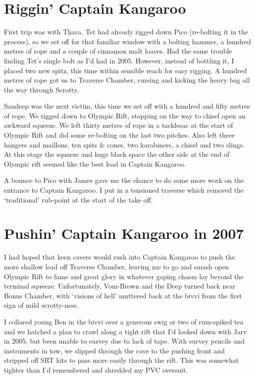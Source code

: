 
\hypertarget{riggin-captain-kangaroo}{%
\section{Riggin' Captain Kangaroo}\label{riggin-captain-kangaroo}}

First trip was with Thara. Tet had already rigged down Pico (re-bolting
it in the process), so we set off for that familiar window with a
bolting hammer, a hundred metres of rope and a couple of cinnamon malt
loaves. Had the same trouble finding Tet's single bolt as I'd had in
2005. However, instead of bottling it, I placed two new spitz, this time
within sensible reach for easy rigging. A hundred metres of rope got us
to Traverse Chamber, cursing and kicking the heavy bag all the way
through Scrotty.

Sandeep was the next victim, this time we set off with a hundred and
fifty metres of rope. We rigged down to Olympic Rift, stopping on the
way to chisel open an awkward squeeze. We left thirty metres of rope in
a tacklesac at the start of Olympic Rift and did some re-bolting on the
last two pitches. Also left three hangers and maillons, ten spits \&
cones, two karabiners, a chisel and two slings. At this stage the
squeeze and huge black space the other side at the end of Olympic rift
seemed like the best lead in Captain Kangaroo.

A bounce to Pico with James gave me the chance to do some more work on
the entrance to Captain Kangaroo. I put in a tensioned traverse which
removed the `traditional' rub-point at the start of the take off.


\hypertarget{pushin-captain-kangaroo-in-2007}{%
\section{Pushin' Captain Kangaroo in
2007}\label{pushin-captain-kangaroo-in-2007}}

I had hoped that keen cavers would rush into Captain Kangaroo to push
the more shallow lead off Traverse Chamber, leaving me to go and smash
open Olympic Rift to fame and great glory in whatever gaping chasm lay
beyond the terminal squeeze. Unfortunately, Vom-Brown and the Deep
turned back near Bonus Chamber, with `visions of hell' muttered back at
the bivvi from the first sign of mild scrotty-ness.

I collared young Ben in the bivvi over a generous swig or two of
rum-spiked tea and we hatched a plan to crawl along a tight rift that
I'd looked down with Jarv in 2005, but been unable to survey due to lack
of tape. With survey pencils and instruments in tow, we slipped through
the cave to the pushing front and stripped off SRT kits to pass more
easily through the rift. This was somewhat tighter than I'd remembered
and shredded my PVC oversuit.

